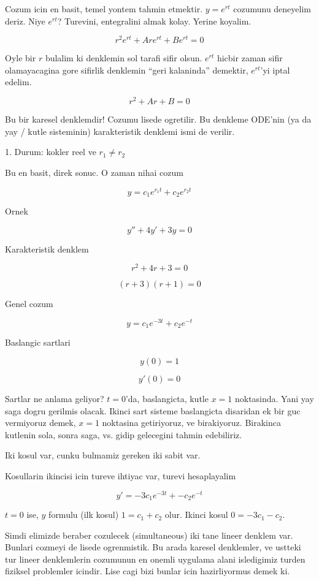 \documentclass[12pt,fleqn]{article}\usepackage{../common}
\begin{document}
Cozum icin en basit, temel yontem tahmin etmektir. $y = e^{rt}$ cozumunu
deneyelim deriz. Niye $e^{rt}$? Turevini, entegralini almak kolay. Yerine
koyalim. 

\[ r^2e^{rt} + Are^{rt} + Be^{rt} = 0 \]

Oyle bir $r$ bulalim ki denklemin sol tarafi sifir olsun. $e^{rt}$ hicbir
zaman sifir olamayacagina gore sifirlik denklemin ``geri kalaninda''
demektir, $e^{rt}$'yi iptal edelim. 

\[ r^2 + Ar + B = 0 \]

Bu bir karesel denklemdir! Cozumu lisede ogretilir. Bu denkleme ODE'nin
(ya da yay / kutle sisteminin) karakteristik denklemi ismi de verilir.

1. Durum: kokler reel ve $r_1 \ne r_2$

Bu en basit, direk sonuc. O zaman nihai cozum

\[ y = c_1 e^{r_1t} + c_2  e^{r_2t}\]

Ornek

\[ y'' + 4y' + 3y = 0 \]

Karakteristik denklem

\[ r^2 + 4r + 3 = 0 \]

\[ (r+3)(r+1) = 0 \]

Genel cozum

\[ y = c_1e^{-3t} + c_2e^{-t} \]

Baslangic sartlari 

\[ y(0) = 1 \]

\[ y'(0) = 0 \]

Sartlar ne anlama geliyor? $t=0$'da, baslangicta, kutle $x=1$
noktasinda. Yani yay saga dogru gerilmis olacak. Ikinci sart sisteme
baslangicta disaridan ek bir guc vermiyoruz demek, $x=1$ noktasina
getiriyoruz, ve birakiyoruz. Birakinca kutlenin sola, sonra saga, vs. gidip
gelecegini tahmin edebiliriz. 

Iki kosul var, cunku bulmamiz gereken iki sabit var. 

Kosullarin ikincisi icin tureve ihtiyac var, turevi hesaplayalim

\[ y' = -3c_1e^{-3t} + - c_2 e^{-t} \]

$t = 0$ ise, $y$ formulu (ilk kosul) $1 = c_1 + c_2$ olur. Ikinci kosul
$0 =
-3c_1 - c_2$. 

Simdi elimizde beraber cozulecek (simultaneous) iki tane lineer denklem
var. Bunlari cozmeyi de lisede ogrenmistik. Bu arada karesel denklemler, ve
ustteki tur lineer denklemlerin cozumunun en onemli uygulama alani
isledigimiz turden fiziksel problemler icindir. Lise cagi bizi bunlar icin
hazirliyormus demek ki.
\end{document}
